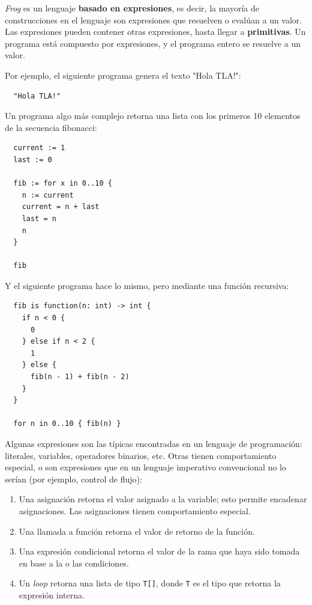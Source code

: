 \textit{Frog} es un lenguaje \textbf{basado en expresiones}, es decir, la mayoría de construcciones en el lenguaje son expresiones que resuelven o evalúan a un valor. Las expresiones pueden contener otras expresiones, hasta llegar a \textbf{primitivas}. Un programa está compuesto por expresiones, y el programa entero se resuelve a un valor.

Por ejemplo, el siguiente programa genera el texto "Hola TLA!":

\small
\begin{verbatim}
  "Hola TLA!"
\end{verbatim}
\normalsize

Un programa algo más complejo retorna una lista con los primeros 10 elementos de la secuencia fibonacci:

\small
\begin{verbatim}
  current := 1
  last := 0

  fib := for x in 0..10 {
    n := current
    current = n + last
    last = n
    n
  }

  fib
\end{verbatim}
\normalsize

Y el siguiente programa hace lo mismo, pero mediante una función recursiva:

\small
\begin{verbatim}
  fib is function(n: int) -> int {
    if n < 0 {
      0
    } else if n < 2 {
      1
    } else {
      fib(n - 1) + fib(n - 2)
    }
  }

  for n in 0..10 { fib(n) }
\end{verbatim}
\normalsize

Algunas expresiones son las típicas encontradas en un lenguaje de programación: literales, variables, operadores binarios, etc. Otras tienen comportamiento especial, o son expresiones que en un lenguaje imperativo convencional no lo serían (por ejemplo, control de flujo):

\begin{enumerate}
	\item Una asignación retorna el valor asignado a la variable; esto permite encadenar asignaciones. Las asignaciones tienen comportamiento especial.
	\item Una llamada a función retorna el valor de retorno de la función.
	\item Una expresión condicional retorna el valor de la rama que haya sido tomada en base a la o las condiciones.
	\item Un \textit{loop} retorna una lista de tipo \texttt{T[]}, donde \texttt{T} es el tipo que retorna la expresión interna.
\end{enumerate}

